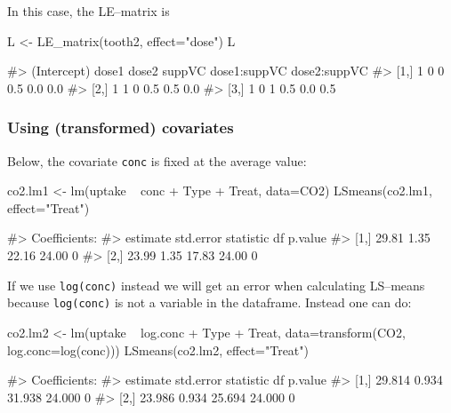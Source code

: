 In this case, the LE--matrix is

\begin{Schunk}
\begin{Sinput}
L <- LE_matrix(tooth2, effect="dose")
L
\end{Sinput}
\begin{Soutput}
#>      (Intercept) dose1 dose2 suppVC dose1:suppVC dose2:suppVC
#> [1,]           1     0     0    0.5          0.0          0.0
#> [2,]           1     1     0    0.5          0.5          0.0
#> [3,]           1     0     1    0.5          0.0          0.5
\end{Soutput}
\end{Schunk}

\hypertarget{using-transformed-covariates}{%
\subsubsection{Using (transformed)
covariates}\label{using-transformed-covariates}}

Below, the covariate \texttt{conc} is fixed at the average value:

\begin{Schunk}
\begin{Sinput}
co2.lm1 <- lm(uptake ~ conc + Type + Treat, data=CO2)
LSmeans(co2.lm1, effect="Treat")
\end{Sinput}
\begin{Soutput}
#> Coefficients:
#>      estimate std.error statistic    df p.value
#> [1,]    29.81      1.35     22.16 24.00       0
#> [2,]    23.99      1.35     17.83 24.00       0
\end{Soutput}
\end{Schunk}

If we use \texttt{log(conc)} instead we will get an error when
calculating LS--means because \texttt{log(conc)} is not a variable in
the dataframe. Instead one can do:

\begin{Schunk}
\begin{Sinput}
co2.lm2 <- lm(uptake ~ log.conc + Type + Treat,
             data=transform(CO2, log.conc=log(conc)))
LSmeans(co2.lm2, effect="Treat")
\end{Sinput}
\begin{Soutput}
#> Coefficients:
#>      estimate std.error statistic     df p.value
#> [1,]   29.814     0.934    31.938 24.000       0
#> [2,]   23.986     0.934    25.694 24.000       0
\end{Soutput}
\end{Schunk}

